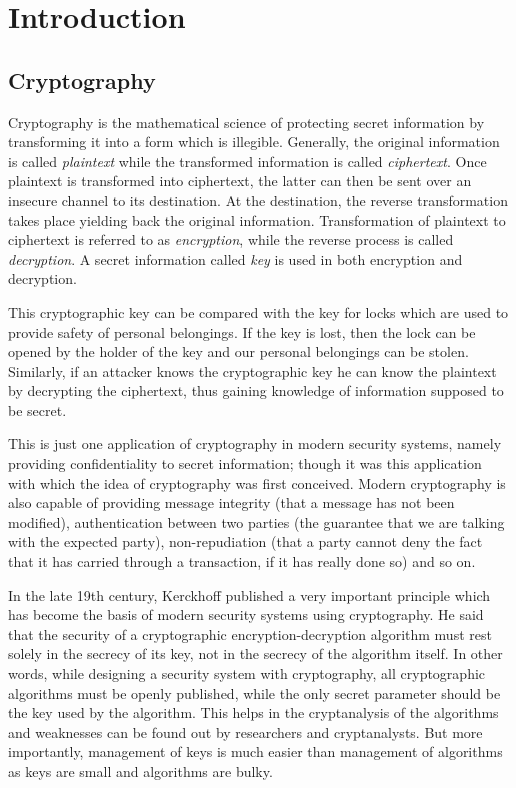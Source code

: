 \chapter{Introduction}
\label{chapter:intro}

\section{Cryptography}

Cryptography is the mathematical science of protecting secret information by transforming it into a form which is illegible. Generally, the original information is called \textit{plaintext} while the transformed information is called \textit{ciphertext}. Once plaintext is transformed into ciphertext, the latter can then be sent over an insecure channel to its destination. At the destination, the reverse transformation takes place yielding back the original information. Transformation of plaintext to ciphertext is referred to as \textit{encryption}, while the reverse process is called \textit{decryption}. A secret information called \textit{key} is used in both encryption and decryption. 

This cryptographic key can be compared with the key for locks which are used to provide safety of personal belongings. If the key is lost, then the lock can be opened by the holder of the key and our personal belongings can be stolen. Similarly, if an attacker knows the cryptographic key he can know the plaintext by decrypting the ciphertext, thus gaining knowledge of information supposed to be secret.  

This is just one application of cryptography in modern security systems, namely providing confidentiality to secret information; though it was this application with which the idea of cryptography was first conceived. Modern cryptography is also capable of providing message integrity (that a message has not been modified), authentication between two parties (the guarantee that we are talking with the expected party), non-repudiation (that a party cannot deny the fact that it has carried through a transaction, if it has really done so) and so on. 

In the late 19th century, Kerckhoff published a very important principle \cite{kerckhoff} which has become the basis of modern security systems using cryptography. He said that the security of a cryptographic encryption-decryption algorithm must rest solely in the secrecy of its key, not in the secrecy of the algorithm itself. In other words, while designing a security system with cryptography, all cryptographic algorithms must be openly published, while the only secret parameter should be the key used by the algorithm. This helps in the cryptanalysis of the algorithms and weaknesses can be found out by researchers and cryptanalysts. But more importantly, management of keys is much easier than management of algorithms as keys are small and algorithms are bulky.

